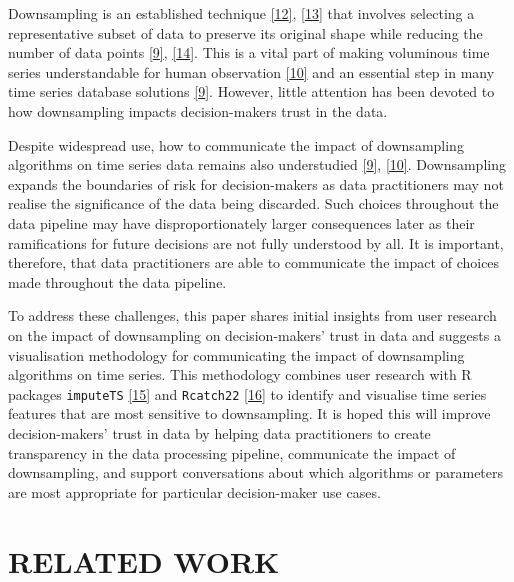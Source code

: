 \documentclass{article}
\begin{document}
Downsampling is an established technique
\protect\hyperlink{ref-downsampling}{{[}12{]}},
\protect\hyperlink{ref-sampling}{{[}13{]}} that involves selecting a
representative subset of data to preserve its original shape while
reducing the number of data points
\protect\hyperlink{ref-datapoint}{{[}9{]}},
\protect\hyperlink{ref-MinMaxLTTB}{{[}14{]}}. This is a vital part of
making voluminous time series understandable for human observation
\protect\hyperlink{ref-Sveinn}{{[}10{]}} and an essential step in many
time series database solutions
\protect\hyperlink{ref-datapoint}{{[}9{]}}. However, little attention
has been devoted to how downsampling impacts decision-makers trust in
the data.

Despite widespread use, how to communicate the impact of downsampling
algorithms on time series data remains also understudied
\protect\hyperlink{ref-datapoint}{{[}9{]}},
\protect\hyperlink{ref-Sveinn}{{[}10{]}}. Downsampling expands the
boundaries of risk for decision-makers as data practitioners may not
realise the significance of the data being discarded. Such choices
throughout the data pipeline may have disproportionately larger
consequences later as their ramifications for future decisions are not
fully understood by all. It is important, therefore, that data
practitioners are able to communicate the impact of choices made
throughout the data pipeline.

To address these challenges, this paper shares initial insights from
user research on the impact of downsampling on decision-makers' trust in
data and suggests a visualisation methodology for communicating the
impact of downsampling algorithms on time series. This methodology
combines user research with R packages \texttt{imputeTS}
\protect\hyperlink{ref-imputeTS_R}{{[}15{]}} and \texttt{Rcatch22}
\protect\hyperlink{ref-catch22_R}{{[}16{]}} to identify and visualise
time series features that are most sensitive to downsampling. It is
hoped this will improve decision-makers' trust in data by helping data
practitioners to create transparency in the data processing pipeline,
communicate the impact of downsampling, and support conversations about
which algorithms or parameters are most appropriate for particular
decision-maker use cases.

\hypertarget{related-work}{%
\section{RELATED WORK}\label{related-work}}
\end{document}
